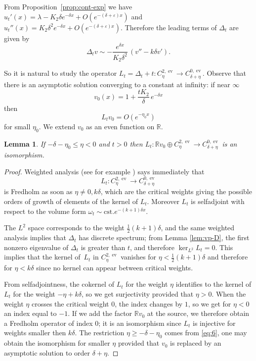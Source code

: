 \documentclass[JEP,XML,SOM,Unicode, NoEqCountersInSection, NoFloatCountersInSection]{cedram}
\let\epsilon\varepsilon
\theoremstyle{plain}
\newtheorem{lem}[thm]{Lemma}
\theoremstyle{definition}
\DeclareMathOperator{\ev}{ev}
\begin{document}
From Proposition~\ref{prop:cont-exp} we have
$u_t'(x)=\lambda-K_2\delta e^{-\delta x}+O(e^{-(\delta+\epsilon)x})$ and
$u_t''(x)=K_2\delta^2e^{-\delta x}+O(e^{-(\delta+\epsilon)x})$. Therefore the leading terms of $\Delta_t$ are given by
\[ \Delta_tv \sim -\frac{e^{\delta x}}{K_2\delta^2}\, ( v'' - k\delta v'). \]

So it is natural to study the operator $L_t=\Delta_t+t:C^{2,\ev}_\eta\to C^{0,\ev}_{\delta+\eta}$. Observe that there is an asymptotic solution converging to a constant at infinity: if near $\infty$
\begin{equation}
v_0(x) = 1 + \frac{tK_2}{\delta}\, e^{-\delta x}
\end{equation}
then
\begin{equation}
L_tv_0=O(e^{-\eta_0 x})\label{eq:6}
\end{equation}
for small $\eta_0$.
We extend $v_0$ as an even function on $\mathbb{R}$.

\begin{lem}\label{lem:L-iso}
If $-\delta-\eta_0\leq\eta<0$ and $t>0$ then $L_t:\mathbb{R}v_0 \oplus C^{2,\ev}_\eta\to C^{0,\ev}_{\delta+\eta}$ is an isomorphism.
\end{lem}
\begin{proof}
Weighted analysis (see for example \cite{LocMcO}) says immediately that \[L_t:C^{2,\ev}_\eta\to C^{0,\ev}_{\delta+\eta}\] is Fredholm as soon as $\eta\neq0, k\delta$, which are the critical weights giving the possible orders of growth of elements of the kernel of $L_t$. Moreover $L_t$ is selfadjoint with respect to the volume form $\omega_t\sim \mathrm{cst.} e^{-(k+1)\delta x}$.

The $L^2$ space corresponds to the weight $\frac12 (k+1)\delta$, and the same weighted analysis implies that $\Delta_t$ has discrete spectrum; from Lemma \ref{lem:vp-D}, the first nonzero eigenvalue of $\Delta_t$ is greater than $t$, and therefore $\ker_{L^2}L_t=0$. This implies that the kernel of~$L_t$ in $C^{2,\ev}_\eta$ vanishes for $\eta<\frac12 (k+1)\delta$ and therefore for $\eta<k\delta$ since no kernel can appear between critical weights.

From selfadjointness, the cokernel of $L_t$ for the weight $\eta$ identifies to the kernel of $L_t$ for the weight $-\eta+k\delta$, so we get surjectivity provided that $\eta>0$. When the weight $\eta$ crosses the critical weight $0$, the index changes by $1$, so we get for $\eta<0$ an index equal to $-1$. If we add the factor $\mathbb{R}v_0$ at the source, we therefore obtain a Fredholm operator of index 0; it is an isomorphism since $L_t$ is injective for weights smaller then $k\delta$. The restriction $\eta\geq-\delta-\eta_0$ comes from \eqref{eq:6}, one may obtain the isomorphism for smaller $\eta$ provided that $v_0$ is replaced by an asymptotic solution to order $\delta+\eta$.
\end{proof}
\end{document}
